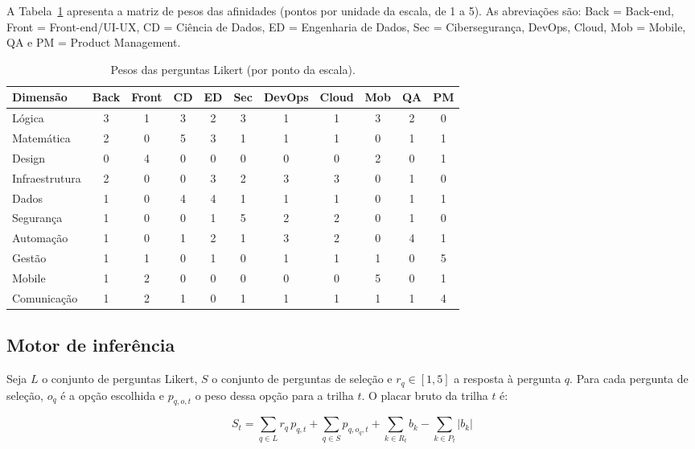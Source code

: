 \documentclass[12pt,a4paper]{article}
\begin{document}
A Tabela~\ref{tab:pesos} apresenta a matriz de pesos das afinidades (pontos por
unidade da escala, de 1 a 5). As abrevia\c{c}\~oes s\~ao: Back = Back-end,
Front = Front-end/UI-UX, CD = Ci\^encia de Dados, ED = Engenharia de Dados,
Sec = Ciberseguran\c{c}a, DevOps, Cloud, Mob = Mobile, QA e PM = Product Management.

\begin{table}[htbp]
\centering
\caption{Pesos das perguntas Likert (por ponto da escala).}
\label{tab:pesos}
\footnotesize
\setlength{\tabcolsep}{4pt}
\begin{tabular}{@{}lcccccccccc@{}}
\toprule
Dimens\~ao & Back & Front & CD & ED & Sec & DevOps & Cloud & Mob & QA & PM \\
\midrule
L\'ogica        & 3 & 1 & 3 & 2 & 3 & 1 & 1 & 3 & 2 & 0 \\
Matem\'atica    & 2 & 0 & 5 & 3 & 1 & 1 & 1 & 0 & 1 & 1 \\
Design          & 0 & 4 & 0 & 0 & 0 & 0 & 0 & 2 & 0 & 1 \\
Infraestrutura  & 2 & 0 & 0 & 3 & 2 & 3 & 3 & 0 & 1 & 0 \\
Dados           & 1 & 0 & 4 & 4 & 1 & 1 & 1 & 0 & 1 & 1 \\
Seguran\c{c}a   & 1 & 0 & 0 & 1 & 5 & 2 & 2 & 0 & 1 & 0 \\
Automa\c{c}\~ao & 1 & 0 & 1 & 2 & 1 & 3 & 2 & 0 & 4 & 1 \\
Gest\~ao        & 1 & 1 & 0 & 1 & 0 & 1 & 1 & 1 & 0 & 5 \\
Mobile          & 1 & 2 & 0 & 0 & 0 & 0 & 0 & 5 & 0 & 1 \\
Comunica\c{c}\~ao & 1 & 2 & 1 & 0 & 1 & 1 & 1 & 1 & 1 & 4 \\
\bottomrule
\end{tabular}
\end{table}

\subsection{Motor de infer\^encia}

Seja $L$ o conjunto de perguntas Likert, $S$ o conjunto de perguntas de
sele\c{c}\~ao e $r_q \in [1,5]$ a resposta \`a pergunta $q$. Para cada pergunta de
sele\c{c}\~ao, $o_q$ \'e a op\c{c}\~ao escolhida e $p_{q,o,t}$ o peso dessa op\c{c}\~ao
para a trilha $t$. O placar bruto da trilha $t$ \'e:

\begin{equation}
S_t = \sum_{q \in L} r_q \, p_{q,t}
    + \sum_{q \in S} p_{q,o_q,t}
    + \sum_{k \in R_t} b_k
    - \sum_{k \in P_t} |b_k|
\end{equation}
\end{document}
